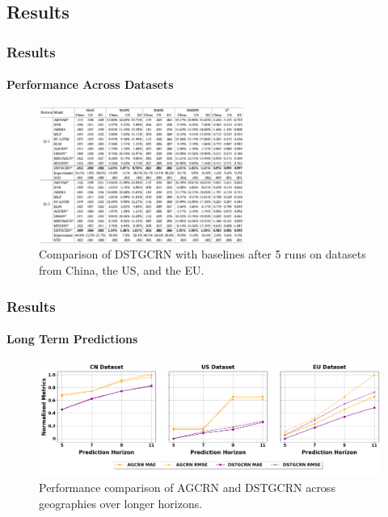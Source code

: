 \documentclass[light]{lutbeamer} %
\begin{document}
\subsection{Results}

\begin{frame}
    \frametitle{Results}
    \framesubtitle{Performance Across Datasets}
    \begin{figure}
        \centering
        \includegraphics[width=0.6\textwidth]{figures/DSTGCRN_tab_results.png}
        \caption{Comparison of DSTGCRN with baselines after 5 runs on datasets from China, the US, and the EU.}
    \end{figure}
\end{frame}



\begin{frame}
    \frametitle{Results}
    \framesubtitle{Long Term Predictions}

    \begin{figure}
        \centering
        \includegraphics[width=\textwidth]{figures/longer_horizon.png}
        \caption{Performance comparison of AGCRN and DSTGCRN across geographies over longer horizons.}
    \end{figure}

\end{frame}
\end{document}
